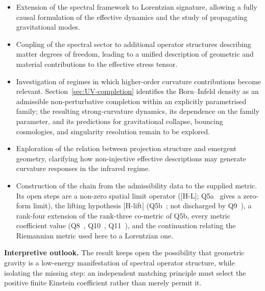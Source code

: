 \documentclass[pdflatex,sn-mathphys-num]{sn-jnl} %
\theoremstyle{remark}
\theoremstyle{plain}
\begin{document}
    \begin{itemize}

      \item Extension of the spectral framework to Lorentzian signature,
      allowing a fully causal formulation of the effective dynamics and
      the study of propagating gravitational modes.

      \item Coupling of the spectral sector to additional operator
      structures describing matter degrees of freedom, leading to a
      unified description of geometric and material contributions to the
      effective stress tensor.

      \item Investigation of regimes in which higher-order curvature
      contributions become relevant.
      Section~\ref{sec:UV-completion} identifies the Born--Infeld density
      as an admissible non-perturbative completion within an explicitly
      parametrised family; the resulting strong-curvature dynamics, its
      dependence on the family parameter, and its predictions for
      gravitational collapse, bouncing cosmologies, and singularity
      resolution remain to be explored.

      \item Exploration of the relation between projection structure and
      emergent geometry, clarifying how non-injective effective
      descriptions may generate curvature responses in the infrared
      regime.

      \item Construction of the chain from the admissibility data to the supplied metric.
      Its open steps are a non-zero spatial limit operator ([H-L]; Q5a~\cite{Beau2026q5a} gives a zero-form
      limit), the lifting hypothesis [H-lift] (Q5b~\cite{Beau2026q5b}; not discharged by Q9~\cite{Beau2026q9}),
      a rank-four extension of the rank-three co-metric of Q5b, every metric coefficient value
      (Q8~\cite{BeauQ8}, Q10~\cite{Beau2026q10}, Q11~\cite{Beau2026q11}), and the continuation relating the
      Riemannian metric used here to a Lorentzian one.

    \end{itemize}

    \textbf{Interpretive outlook.}
    The result keeps open the possibility that geometric gravity is a low-energy manifestation of spectral operator
    structure, while isolating the missing step: an independent matching principle must select the positive finite
    Einstein coefficient rather than merely permit it.

    \clearpage
    
\end{document}
